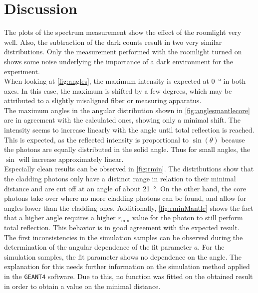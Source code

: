 \section{Discussion}
\label{sec:Discussion}

The plots of the spectrum measurement show the effect of the roomlight very well. Also, the subtraction of the dark counts result in two very similar distributions. Only the measurement performed with the roomlight turned on shows some noise underlying the importance of a dark environment for the experiment.\\
When looking at \autoref{fig:angles}, the maximum intensity is expected at \qty{0}{\degree} in both axes. In this case, the maximum is shifted by a few degrees, which may be attributed to a slightly misaligned fiber or measuring apparatus.\\
The maximum angles in the angular distribution shown in \autoref{fig:anglesmantlecore} are in agreement with the calculated ones, showing only a minimal shift. 
The intensity seems to increase linearly with the angle until total reflection is reached. This is expected, as the reflected intensity is proportional to $\sin(\theta)$ because the photons are equally distributed in the solid angle. Thus for small angles, the $\sin$ will increase approximately linear.\\%
Especially clean results can be observed in \autoref{fig:rmin}. The distributions show that the cladding photons only have a distinct range in relation to their minimal distance and are cut off at an angle of about \qty{21}{\degree}. On the other hand, the core photons take over where no more cladding photons can be found, and allow for angles lower than the cladding ones. Additionally, \autoref{fig:rminMantle} shows the fact that a higher angle requires a higher $r_\mathrm{min}$ value for the photon to still perform total reflection. This behavior is in good agreement with the expected result.\\
The first inconsistencies in the simulation samples can be observed during the determination of the angular dependence of the fit parameter $a$. For the simulation samples, the fit parameter shows no dependence on the angle. The explanation for this needs further information on the simulation method applied in the \texttt{GEANT4} software. Due to this, no function was fitted on the obtained result in order to obtain a value on the minimal distance.\\
